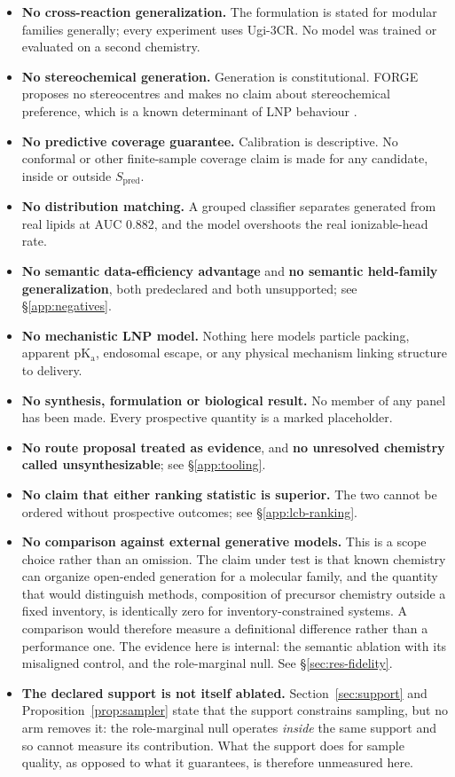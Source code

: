 \documentclass{article}
\providecommand{\tightlist}{\setlength{\itemsep}{0pt}\setlength{\parskip}{0pt}}
\newcommand{\GroupedAUC}{0.882}
\newcommand{\Spred}{\ensuremath{S_{\mathrm{pred}}}}
\begin{document}
\begin{itemize}\tightlist
\item \textbf{No cross-reaction generalization.} The formulation is stated for modular families
  generally; every experiment uses Ugi-3CR. No model was trained or evaluated on a second chemistry.
\item \textbf{No stereochemical generation.} Generation is constitutional. FORGE proposes no
  stereocentres and makes no claim about stereochemical preference, which is a known determinant of
  LNP behaviour \citep{hatit2023nanoparticle}.
\item \textbf{No predictive coverage guarantee.} Calibration is descriptive. No conformal or other
  finite-sample coverage claim is made for any candidate, inside or outside \Spred{}.
\item \textbf{No distribution matching.} A grouped classifier separates generated from real lipids at
  AUC \GroupedAUC{}, and the model overshoots the real ionizable-head rate.
\item \textbf{No semantic data-efficiency advantage} and \textbf{no semantic held-family
  generalization}, both predeclared and both unsupported; see \S\ref{app:negatives}.
\item \textbf{No mechanistic LNP model.} Nothing here models particle packing, apparent pK$_\text{a}$,
  endosomal escape, or any physical mechanism linking structure to delivery.
\item \textbf{No synthesis, formulation or biological result.} No member of any panel has been made.
  Every prospective quantity is a marked placeholder.
\item \textbf{No route proposal treated as evidence}, and \textbf{no unresolved chemistry called
  unsynthesizable}; see \S\ref{app:tooling}.
\item \textbf{No claim that either ranking statistic is superior.} The two cannot be ordered
  without prospective outcomes; see \S\ref{app:lcb-ranking}.
\item \textbf{No comparison against external generative models.} This is a scope choice rather than
  an omission. The claim under test is that known chemistry can organize open-ended generation for a
  molecular family, and the quantity that would distinguish methods, composition of precursor
  chemistry outside a fixed inventory, is identically zero for inventory-constrained systems. A
  comparison would therefore measure a definitional difference rather than a performance one. The
  evidence here is internal: the semantic ablation with its misaligned control, and the role-marginal
  null. See \S\ref{sec:res-fidelity}.
\item \textbf{The declared support is not itself ablated.} Section~\ref{sec:support} and
  Proposition~\ref{prop:sampler} state that the support constrains sampling, but no arm removes it:
  the role-marginal null operates \emph{inside} the same support and so cannot measure its
  contribution. What the support does for sample quality, as opposed to what it guarantees, is
  therefore unmeasured here.
\end{itemize}
\end{document}
